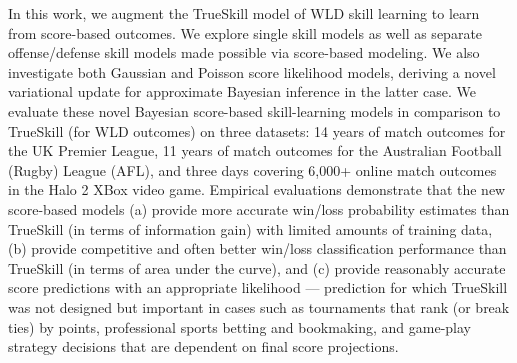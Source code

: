 In this work, we augment the TrueSkill model of WLD skill learning to
learn from score-based outcomes.  We explore single skill models as
well as separate offense/defense skill models made possible via
score-based modeling.  We also investigate both Gaussian and Poisson
score likelihood models, deriving a novel variational update for
approximate Bayesian inference in the latter case.  We evaluate these
novel Bayesian score-based skill-learning models in comparison to
TrueSkill (for WLD outcomes) on three datasets: 14 years of match
outcomes for the UK Premier League, 11 years of match outcomes for the
Australian Football (Rugby) League (AFL), and three days covering
6,000+ online match outcomes in the Halo 2 XBox video game.  Empirical
evaluations demonstrate that the new score-based models (a) provide
more accurate win/loss probability estimates than TrueSkill (in terms
of information gain) with limited amounts of training data, (b)
provide competitive and often better win/loss classification
performance than TrueSkill (in terms of area under the curve), and (c)
provide reasonably accurate score predictions with an appropriate
likelihood --- prediction for which TrueSkill was not designed but
important in cases such as tournaments that rank (or break ties) by
points, professional sports betting and bookmaking, and game-play
strategy decisions that are dependent on final score projections.